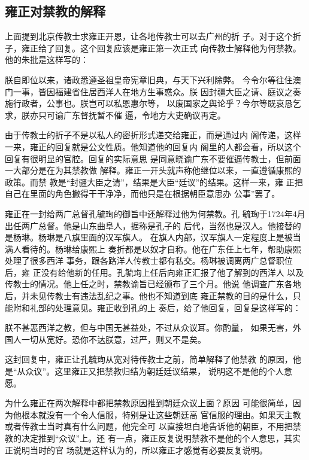 \subsection{雍正对禁教的解释}
\par
上面提到北京传教士求雍正开恩，让各地传教士可以去广州的折%
子。对于这个折子，雍正给了回复。这个回复应该是雍正第一次正式%
向传教士解释他为何禁教。他的朱批是这样写的：%
\par
{\bookkai 朕自即位以来，诸政悉遵圣祖皇帝宪章旧典，与天下兴利除弊。}%
{\bookkai 今令尔等往住澳门一事，皆因福建省住居西洋人在地方生事惑众。朕}%
{\bookkai 因封疆大臣之请、庭议之奏施行政者，公事也。朕岂可以私恩惠尔等，}%
{\bookkai 以废国家之舆论乎？今尔等既哀恳乞求，朕亦只可谕广东督抚暂不催}%
{\bookkai 逼，令地方大吏确议再定。}%
\par
由于传教士的折子不是以私人的密折形式递交给雍正，而是通过内%
阁传递，这样一来，雍正的回复就是公文性质。他知道他的回复内%
阁里的人都会看，所以这个回复有很明显的官腔。回复的实际意思%
是同意晓谕广东不要催逼传教士，但前面一大部分是在为其禁教做%
解释。雍正一开头就声称他继位以来，一直遵循康熙的政策。而禁%
教是“封疆大臣之请”，结果是大臣“廷议”的结果。这样一来，雍%
正把自己在里面的角色撇得干干净净，而他只是在根据朝臣意思办%
公事”罢了。%
\par
雍正在一封给两广总督孔毓珣的御旨中还解释过他为何禁教。孔%
毓珣于1724年4月出任两广总督。他是山东曲阜人，据称是孔子的%
后代，当然也是汉人。他接替的是杨琳。杨琳是八旗里面的汉军旗人。%
在旗人内部，汉军旗人一定程度上是被当满人看待的。杨琳给康熙上%
奏折都是以奴才自称。他在广东任上七年，帮助康熙处理了很多西洋%
事务，跟各路洋人传教士都有私交。杨琳被调离两广总督职位后，雍%
正没有给他新的任用。孔毓珣上任后向雍正汇报了他了解到的西洋人%
以及传教士的情况。他上任之时，禁教谕旨已经颁布了三个月。他说%
他调查广东各地后，并未见传教士有违法乱纪之事。他也不知道到底%
雍正禁教的目的是什么，只能附和礼部的处理意见。雍正收到孔的上%
奏后，给了他回复，回复是这样写的：%
\par
{\bookkai 朕不甚恶西洋之教，但与中国无甚益处，不过从众议耳。你酌量，}%
{\bookkai 如果无害，外国人一切从宽好。恐你不达朕意，过严，则又不是矣。}%
\par
这封回复中，雍正让孔毓珣从宽对待传教士之前，简单解释了他禁教%
的原因，他是“从众议”。这里雍正又把禁教归结为朝廷廷议结果，%
说明这不是他的个人意愿。%
\par
为什么雍正在两次解释中都把禁教原因推到朝廷众议上面？原因%
可能很简单，因为他根本就没有一个令人信服，特别是让这些朝廷高%
官信服的理由。如果天主教或者传教士当时真有什么问题，他完全可%
以直接坦白地告诉他的朝臣，不用把禁教的决定推到“众议”上。还%
有一点，雍正反复说明禁教不是他的个人意思，其实正说明当时的官%
场就是这样认为的，所以雍正才感觉有必要反复说明。%
